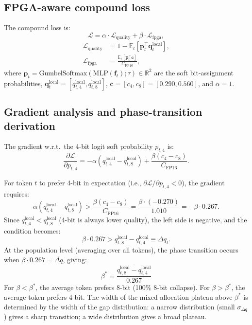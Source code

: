 \documentclass{article}
\begin{document}
\subsection{FPGA-aware compound loss}

The compound loss is:
\[
\mathcal{L} = \alpha \cdot \mathcal{L}_\text{quality} + \beta \cdot \mathcal{L}_\text{fpga},
\]
\begin{align}
\mathcal{L}_\text{quality} &= 1 - \mathbb{E}_t\!\left[\mathbf{p}_t^\top \mathbf{q}_t^\text{local}\right], \\
\mathcal{L}_\text{fpga} &= \frac{\mathbb{E}_t[\mathbf{p}_t^\top \mathbf{c}]}{C_\text{FP16}},
\end{align}
where $\mathbf{p}_t = \text{GumbelSoftmax}(\text{MLP}(\mathbf{f}_t); \tau) \in \mathbb{R}^2$
are the soft bit-assignment probabilities, $\mathbf{q}_t^\text{local} = [q_{t,4}^\text{local}, q_{t,8}^\text{local}]$,
$\mathbf{c} = [c_4, c_8] = [0.290, 0.560]$, and $\alpha{=}1$.

\subsection{Gradient analysis and phase-transition derivation}

The gradient w.r.t.\ the 4-bit logit soft probability $p_{t,4}$ is:
\begin{equation}
\frac{\partial \mathcal{L}}{\partial p_{t,4}} = -\alpha(q_{t,4}^\text{local} - q_{t,8}^\text{local}) + \frac{\beta(c_4 - c_8)}{C_\text{FP16}}.
\label{eq:gradient}
\end{equation}

For token $t$ to prefer 4-bit in expectation (i.e., $\partial\mathcal{L}/\partial p_{t,4} < 0$),
the gradient requires:
\[
\alpha(q_{t,4}^\text{local} - q_{t,8}^\text{local}) > \frac{\beta(c_4 - c_8)}{C_\text{FP16}}
= \frac{\beta \cdot (-0.270)}{1.010} = -\beta \cdot 0.267.
\]
Since $q_{t,4}^\text{local} < q_{t,8}^\text{local}$ (4-bit is always lower quality), the
left side is negative, and the condition becomes:
\[
\beta \cdot 0.267 > q_{t,8}^\text{local} - q_{t,4}^\text{local} \equiv \Delta q_t.
\]
At the population level (averaging over all tokens), the phase transition occurs when
$\beta \cdot 0.267 = \overline{\Delta q}$, giving:
\begin{equation}
\boxed{\beta^* = \frac{\overline{q_{t,8}^\text{local} - q_{t,4}^\text{local}}}{0.267}}
\label{eq:betastar}
\end{equation}
For $\beta < \beta^*$, the average token prefers 8-bit (100\% 8-bit collapse). For $\beta > \beta^*$,
the average token prefers 4-bit. The width of the mixed-allocation plateau above $\beta^*$
is determined by the width of the gap distribution: a narrow distribution (small $\sigma_{\Delta q}$)
gives a sharp transition; a wide distribution gives a broad plateau.
\end{document}
